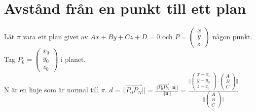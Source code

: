 \section{Avstånd från en punkt till ett plan}
Låt $\pi$ vara ett plan givet av $Ax+By+Cz+D=0$ och $P=\begin{pmatrix}x\\y\\z\end{pmatrix}$ någon punkt.\\
Tag $P_{0}=\begin{pmatrix}x_{0}\\y_{0}\\z_{0}\end{pmatrix}$ i planet.\\
N är en linje som är normal till $\pi$.
$d=||\overrightarrow{P_{0}P_{N}}||=\frac{||\overrightarrow{P_{0}P_{N}}\cdot \bm{n}||}{||\bm{n}||}=\frac{
    ||\begin{pmatrix}
        x-x_{0}\\y-y_{0}\\z-z_{0}
    \end{pmatrix}\cdot
    \begin{pmatrix}
        A\\B\\C
    \end{pmatrix}||
}{
    ||\begin{pmatrix}
        A\\B\\C
    \end{pmatrix}||
}$
